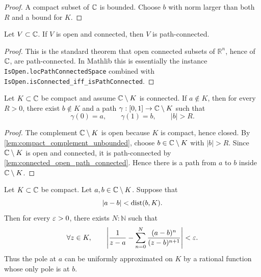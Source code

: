 \begin{proof}
    A compact subset of \(\mathbb{C}\) is bounded. Choose \(b\) with norm larger than both
    \(R\) and a bound for \(K\).
\end{proof}

\begin{lemma}
    \label{lem:connected_open_path_connected}
    \leanok
    Let \(V \subset \mathbb{C}\). If \(V\) is open and connected, then \(V\) is
    path-connected.
\end{lemma}

\begin{proof}
    This is the standard theorem that open connected subsets of \(\mathbb{R}^n\),
    hence of \(\mathbb{C}\), are path-connected. In Mathlib this is essentially the
    instance \texttt{IsOpen.locPathConnectedSpace} combined with
    \texttt{IsOpen.isConnected\_iff\_isPathConnected}.
\end{proof}

\begin{lemma}
    \label{lem:path_to_infinity}
    Let \(K \subset \mathbb{C}\) be compact and assume \(\mathbb{C} \setminus K\) is connected. If
    \(a \notin K\), then for every \(R > 0\), there exist \(b \notin K\) and a path
    \(\gamma : [0,1] \to \mathbb{C} \setminus K\) such that
    \[
      \gamma(0)=a,\qquad \gamma(1)=b,\qquad |b|>R .
    \]
\end{lemma}

\begin{proof}
    The complement \(\mathbb{C} \setminus K\) is open because \(K\) is compact, hence
    closed. By \cref{lem:compact_complement_unbounded}, choose \(b \in \mathbb{C} \setminus K\)
    with \(|b|>R\). Since \(\mathbb{C} \setminus K\) is open and connected, it is
    path-connected by \cref{lem:connected_open_path_connected}. Hence there is a
    path from \(a\) to \(b\) inside \(\mathbb{C} \setminus K\).
\end{proof}

\begin{lemma}
    \label{lem:local_pole_moving}
    \leanok
    Let \(K \subset \mathbb{C}\) be compact. Let \(a,b \in \mathbb{C} \setminus K\). Suppose that
    \[
      |a-b| < \operatorname{dist}(b,K).
    \]
    Then for every \(\varepsilon > 0\), there exists \(N : \mathbb{N}\) such that
    \[
      \forall z \in K,\qquad
      \left|
        \frac{1}{z-a}
        -
        \sum_{n=0}^{N}
          \frac{(a-b)^n}{(z-b)^{n+1}}
      \right|
      < \varepsilon .
    \]
    Thus the pole at \(a\) can be uniformly approximated on \(K\) by a rational
    function whose only pole is at \(b\).
\end{lemma}

